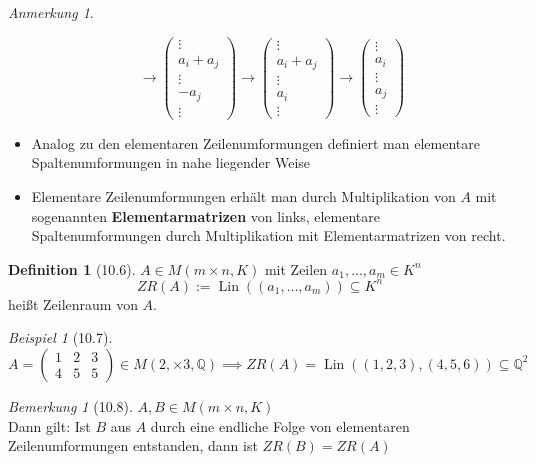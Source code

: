 \documentclass[a4paper]{scrartcl}
\DeclareMathOperator{\Lin}{Lin}
\theoremstyle{definition}
\newtheorem{defn}{Definition}
\theoremstyle{plain}
\theoremstyle{plain}
\theoremstyle{remark}
\newtheorem{remark}{Bemerkung}
\theoremstyle{remark}
\newtheorem{note}{Anmerkung}
\theoremstyle{remark}
\theoremstyle{remark}
\theoremstyle{remark}
\newtheorem{ex}{Beispiel}
\begin{document}
\begin{note}
\begin{itemize}
\begin{equation}
\to \begin{pmatrix} \vdots \\ a_i + a_j \\ \vdots \\ -a_j  \\ \vdots \end{pmatrix}
\to \begin{pmatrix} \vdots \\ a_i + a_j \\ \vdots \\ a_i  \\ \vdots \end{pmatrix}
\to \begin{pmatrix} \vdots \\ a_i \\ \vdots \\ a_j  \\ \vdots \end{pmatrix}
\end{equation}
\item Analog zu den elementaren Zeilenumformungen definiert man elementare Spaltenumformungen in nahe liegender Weise
\item Elementare Zeilenumformungen erhält man durch Multiplikation von $A$ mit sogenannten \textbf{Elementarmatrizen} von links,
elementare Spaltenumformungen durch Multiplikation mit Elementarmatrizen von recht.
\end{itemize}
\end{note}
\begin{defn}[10.6]
$A\in M(m\times n, K)$ mit Zeilen $a_1, \ldots, a_m \in K^n$ \\
  \[ZR(A) := \Lin((a_1, \ldots, a_m)) \subseteq K^n\]
heißt Zeilenraum von $A$.
\end{defn}
\begin{ex}[10.7]
\begin{equation}
A = \begin{pmatrix} 1 & 2 & 3 \\ 4 & 5 & 5 \end{pmatrix} \in M(2,\times 3, \mathbb{Q}) \implies ZR(A) = \Lin((1,2,3), (4,5,6)) \subseteq \mathbb{Q}^2
\end{equation}
\end{ex}
\begin{remark}[10.8]
$A,B \in M(m\times n, K)$ \\
  Dann gilt: Ist $B$ aus $A$ durch eine endliche Folge von elementaren Zeilenumformungen entstanden, dann ist $ZR(B) = ZR(A)$
\end{remark}
\end{document}
